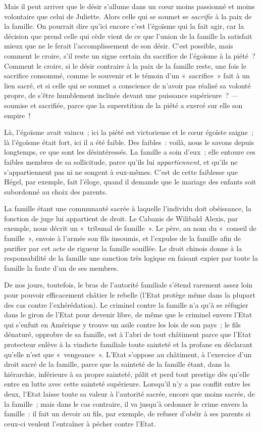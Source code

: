 \documentclass[french,twoside]{book} %
\begin{document}
Mais il peut arriver que le désir s’allume dans un cœur moins passionné et moins volontaire que celui de Juliette. Alors celle qui se soumet se \emph{sacrifie} à la paix de la famille. On pourrait dire qu’ici encore c’est l’égoïsme qui la fait agir, car la décision que prend celle qui cède vient de ce que l’union de la famille la satisfait mieux que ne le ferait l’accomplissement de son désir. C’est possible, mais comment le croire, s’il reste un signe certain du sacrifice de l’égoïsme à la piété ? Comment le croire, si le désir contraire à la paix de la famille reste, une fois le sacrifice consommé, comme le souvenir et le témoin d’un « sacrifice » fait à un lien sacré, et si celle qui se soumet a conscience de n’avoir pas réalisé sa volonté propre, de s’être humblement inclinée devant une puissance supérieure ? — soumise et sacrifiée, parce que la superstition  de la piété a exercé sur elle son empire !\par
Là, l’égoïsme avait vaincu ; ici la piété est victorieuse et le cœur égoïste saigne ; là l’égoïsme était fort, ici il a été faible. Des faibles : voilà, nous le savons depuis longtemps, ce que sont les désintéressés. La famille a soin d’eux ; elle entoure ces faibles membres de sa sollicitude, parce qu’ils lui \emph{appartiennent}, et qu’ils ne s’appartiennent pas ni ne songent à eux-mêmes. C’est de cette faiblesse que Hégel, par exemple, fait l’éloge, quand il demande que le mariage des enfants soit subordonné au choix des parents.\par
La famille étant une communauté sacrée à laquelle l’individu doit obéissance, la fonction de juge lui appartient de droit. Le Cabanis de Wilibald Alexis, par exemple, nous décrit un « tribunal de famille ». Le père, au nom du « conseil de famille », envoie à l’armée son fils insoumis, et l’expulse de la famille afin de purifier par cet acte de rigueur la famille souillée. Le droit chinois donne à la responsabilité de la famille une sanction très logique en faisant expier par toute la famille la faute d’un de ses membres.\par
De nos jours, toutefois, le bras de l’autorité familiale s’étend rarement assez loin pour pouvoir efficacement châtier le rebelle (l’Etat protège même dans la plupart des cas contre l’exhérédation). Le criminel contre la famille n’a qu’à se réfugier dans le giron de l’Etat pour devenir libre, de même que le criminel envers l’Etat qui s’enfuit en Amérique y trouve un asile contre les lois de son pays ; le fils dénaturé, opprobre de sa famille, est à l’abri de tout châtiment parce que l’Etat protecteur enlève à la vindicte familiale toute sainteté et la profane en déclarant qu’elle n’est que « vengeance ». L’Etat s’oppose au châtiment, à l’exercice d’un droit sacré de la famille, parce que la sainteté de la famille étant, dans la hiérarchie, inférieure à sa propre sainteté, pâlit et perd tout prestige dès qu’elle entre en lutte avec cette sainteté supérieure. Lorsqu’il n’y a pas conflit entre les deux, l’Etat laisse toute sa valeur à l’autorité sacrée, encore  que moins sacrée, de la famille ; mais dans le cas contraire, il va jusqu’à ordonner le crime envers la famille : il fait un devoir au fils, par exemple, de refuser d’obéir à ses parents si ceux-ci veulent l’entraîner à pécher contre l’Etat.\par
\end{document}
